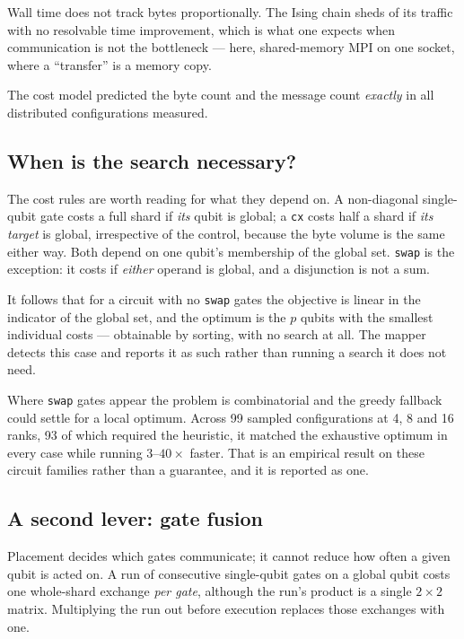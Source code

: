 \documentclass[11pt]{article}
\begin{document}
Wall time does not track bytes proportionally. The Ising chain sheds
\aegisqIsingTraffic{} of its traffic with no resolvable time improvement, which
is what one expects when communication is not the bottleneck --- here,
shared-memory MPI on one socket, where a ``transfer'' is a memory copy.

The cost model predicted the byte count and the message count \emph{exactly} in
all \aegisqPredictionConfigs{} distributed configurations measured.

\subsection{When is the search necessary?}

The cost rules are worth reading for what they depend on. A non-diagonal
single-qubit gate costs a full shard if \emph{its} qubit is global; a
\texttt{cx} costs half a shard if \emph{its target} is global, irrespective
of the control, because the byte volume is the same either way. Both depend on
one qubit's membership of the global set. \texttt{swap} is the exception: it
costs if \emph{either} operand is global, and a disjunction is not a sum.

It follows that for a circuit with no \texttt{swap} gates the objective is
linear in the indicator of the global set, and the optimum is the $p$ qubits
with the smallest individual costs --- obtainable by sorting, with no search
at all. The mapper detects this case and reports it as such rather than
running a search it does not need.

Where \texttt{swap} gates appear the problem is combinatorial and the greedy
fallback could settle for a local optimum. Across 99 sampled configurations at
4, 8 and 16 ranks, 93 of which required the heuristic, it matched the
exhaustive optimum in every case while running $3$--$40\times$ faster. That is
an empirical result on these circuit families rather than a guarantee, and it
is reported as one.

\subsection{A second lever: gate fusion}

Placement decides which gates communicate; it cannot reduce how often a given
qubit is acted on. A run of consecutive single-qubit gates on a global qubit
costs one whole-shard exchange \emph{per gate}, although the run's product is
a single $2\times2$ matrix. Multiplying the run out before execution replaces
those exchanges with one.
\end{document}
